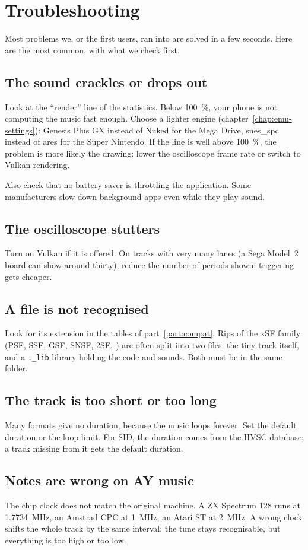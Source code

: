 \chapter{Troubleshooting}

Most problems we, or the first users, ran into are solved in a few seconds. Here are the most common, with what we
check first.

\section{The sound crackles or drops out}
Look at the ``render'' line of the statistics. Below 100~\%, your phone is not computing the music fast enough.
Choose a lighter engine (chapter~\ref{chap:emu-settings}): Genesis Plus GX instead of Nuked for the Mega Drive,
snes\_spc instead of ares for the Super Nintendo. If the line is well above 100~\%, the problem is more likely the
drawing: lower the oscilloscope frame rate or switch to Vulkan rendering.

Also check that no battery saver is throttling the application. Some manufacturers slow down background apps even
while they play sound.

\section{The oscilloscope stutters}
Turn on Vulkan if it is offered. On tracks with very many lanes (a Sega Model~2 board can show around thirty),
reduce the number of periods shown: triggering gets cheaper.

\section{A file is not recognised}
Look for its extension in the tables of part~\ref{part:compat}. Rips of the xSF family (PSF, SSF, GSF, SNSF,
2SF\dots) are often split into two files: the tiny track itself, and a \texttt{.\_lib} library holding the code and
sounds. Both must be in the same folder.

\section{The track is too short or too long}
Many formats give no duration, because the music loops forever. Set the default duration or the loop limit. For SID,
the duration comes from the HVSC database; a track missing from it gets the default duration.

\section{Notes are wrong on AY music}
The chip clock does not match the original machine. A ZX Spectrum 128 runs at 1.7734~MHz, an Amstrad CPC at 1~MHz,
an Atari ST at 2~MHz. A wrong clock shifts the whole track by the same interval: the tune stays recognisable, but
everything is too high or too low.

